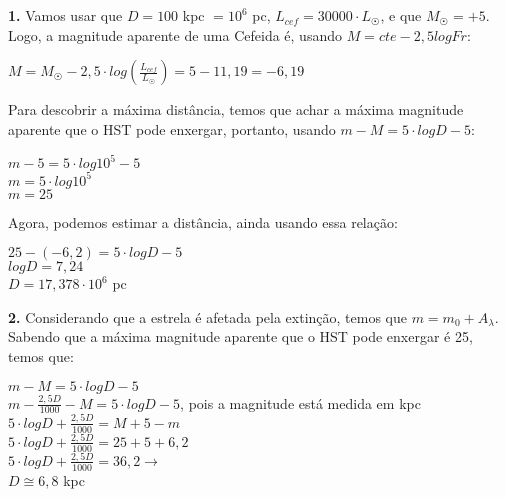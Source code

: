 \documentclass[12pt,letterpaper]{article}
\begin{document}
	\part{}
		\textbf{1.} Vamos usar que $D = 100$ kpc $= 10^6$ pc, $L_{cef} = 30000\cdot L_{\astrosun}$, e que $M_{\astrosun} = +5$. Logo, a magnitude aparente de uma Cefeida é, usando $M = cte -2,5 log Fr$:
        \begin{center}
        	$M = M_{\astrosun} -2,5 \cdot log(\frac{L_{cef}}{L_{\astrosun}}) = 5 - 11,19 = -6,19$
        \end{center}
        
        Para descobrir a máxima distância, temos que achar a máxima magnitude aparente que o HST pode enxergar, portanto, usando $m - M = 5\cdot log D - 5$:
        
        \begin{center}
        	$m - 5 = 5\cdot log 10^5 -5$\\
        	$m = 5\cdot log 10^5$\\
        	$m = 25$
        \end{center}
        
        Agora, podemos estimar a distância, ainda usando essa relação:
        
        \begin{center}
        	$25 - (-6,2) = 5\cdot log D -5$\\
        	$log D = 7,24$\\
        	$D = 17,378 \cdot 10^6$ pc
        \end{center}
        
        \textbf{2.} Considerando que a estrela é afetada pela extinção, temos que $m = m_0 + A_{\lambda}$. Sabendo que a máxima magnitude aparente que o HST pode enxergar é 25, temos que:
        
        \begin{center}
        	$m - M = 5\cdot log D - 5$\\
        	$m - \frac{2,5D}{1000} - M =  5\cdot log D - 5$, pois a magnitude está medida em kpc\\
        	$5\cdot log D + \frac{2,5D}{1000} = M + 5 - m$ \\
        	$5\cdot log D + \frac{2,5D}{1000} = 25 + 5 +6,2$ \\
        	$5\cdot log D + \frac{2,5D}{1000} = 36,2\to $\\
        	$D \cong 6,8$ kpc
        \end{center}
        
\end{document}

